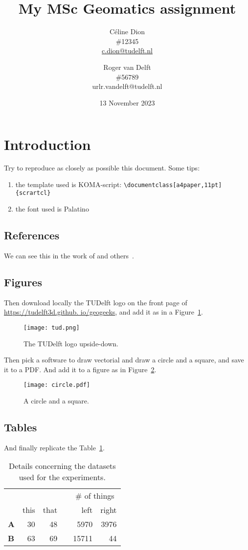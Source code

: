 \documentclass[a4paper,11pt]{scrartcl}
\title{My MSc Geomatics assignment}
\author{Céline Dion\\\#12345\\\url{c.dion@tudelft.nl} \and Roger van Delft\\\#56789\\url{r.vandelft@tudelft.nl}}
\date{13 November 2023}
\begin{document}
\maketitle

%
\section{Introduction}

Try to reproduce as closely as possible this document. Some tips:

\begin{enumerate}
  \item the template used is KOMA-script: \verb|\documentclass[a4paper,11pt]{scrartcl}|
  \item the font used is Palatino
\end{enumerate}

\subsection{References}
     
We can see this in the work of \citet{Schiefer20} and others~\citep{Lan22}.


\subsection{Figures}

Then download locally the TUDelft logo on the front page of \url{https://tudelft3d.github.
io/geogeeks}, and add it as in a Figure~\ref{fig:logo}.
\begin{figure}
  \centering
  \texttt{[image: tud.png]}
  \caption{The TUDelft logo upside-down.}%
\label{fig:logo}
\end{figure}

Then pick a software to draw vectorial and draw a circle and a square, and save it to a PDF\@.
And add it to a figure as in Figure~\ref{fig:circle}.
\begin{figure}
  \centering
  \texttt{[image: circle.pdf]}
  \caption{A circle and a square.}%
\label{fig:circle}
\end{figure}

\subsection{Tables}
And finally replicate the Table~\ref{tab:example}.

\begin{table}
  \centering
  \begin{tabular}{@{}lrrcrr@{}} \toprule
    &&&& \multicolumn{2}{c}{\# of things}  \\
    \cmidrule{5-6} 
    & this & that && left & right  \\ 
    \toprule
    \textbf{A}  & 30 & 48  &&  5970  & 3976   \\
    \textbf{B}  & 63 & 69  && 15711  & 44   \\
    \bottomrule
   \end{tabular}
  \caption{Details concerning the datasets used for the experiments.}%
\label{tab:example}
\end{table}
\end{document}
